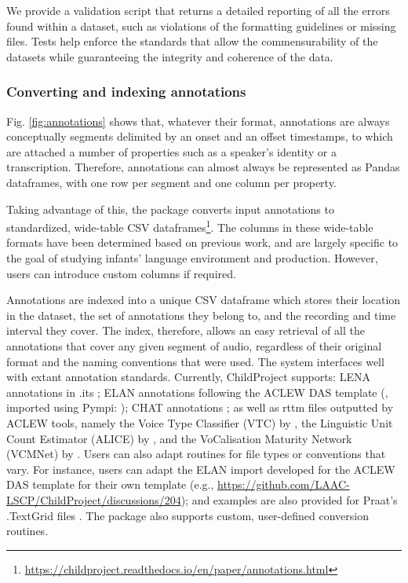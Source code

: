 \documentclass[smallextended]{svjour3}       %
\begin{document}
We provide a validation script that returns a detailed reporting of all the errors found within a dataset, such as violations of the formatting guidelines or missing files. Tests help enforce the standards that allow the commensurability of the datasets while guaranteeing the integrity and coherence of the data.

\subsubsection*{Converting and indexing annotations}\label{section:annotations}

Fig. \ref{fig:annotations} shows that, whatever their format, annotations are always conceptually segments delimited by an onset and an offset timestamps, to which are attached a number of properties such as a speaker's identity or a transcription. Therefore, annotations can almost always be represented as Pandas dataframes, with one row per segment and one column per property.

Taking advantage of this, the package converts input annotations to standardized, wide-table CSV dataframes\footnote{\url{https://childproject.readthedocs.io/en/paper/annotations.html}}. The columns in these wide-table formats have been determined based on previous work, and are largely specific to the goal of studying infants' language environment and production. However, users can introduce custom columns if required.

Annotations are indexed into a unique CSV dataframe which stores their location in the dataset, the set of annotations they belong to, and the recording and time interval they cover. The index, therefore, allows an easy retrieval of all the annotations that cover any given segment of audio, regardless of their original format and the naming conventions that were used. The system interfaces well with extant annotation standards. Currently, ChildProject supports: LENA annotations in .its \citep{xu2008lenatm}; ELAN annotations following the ACLEW DAS template  (\citealt{Casillas2017}, imported using Pympi: \citealt{pympi-1.70}); CHAT annotations \citep{MacWhinney2000}; as well as rttm files outputted by ACLEW tools, namely the Voice Type Classifier (VTC) by \citet{lavechin2020opensource}, the Linguistic Unit Count Estimator (ALICE) by \citet{rasanen2020}, and the VoCalisation Maturity Network (VCMNet) by \citet{AlFutaisi2019}. Users can also adapt routines for file types or conventions that vary. For instance, users can adapt the ELAN import developed for the ACLEW DAS template for their own template (e.g., \url{https://github.com/LAAC-LSCP/ChildProject/discussions/204}); and examples are also provided for Praat's .TextGrid files \citep{boersma2006praat}. The package also supports custom, user-defined conversion routines.
\end{document}
